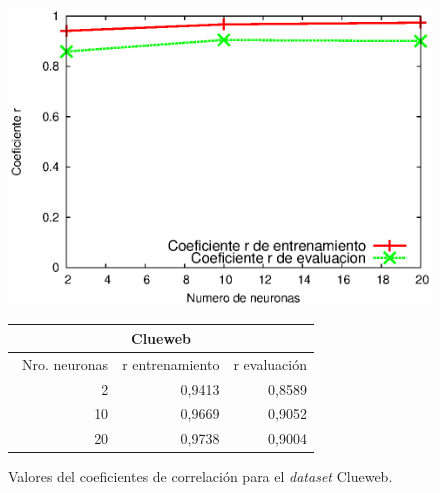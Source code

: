 \begin{figure}[tp]
  \begin{minipage}[][][b]{0.5\linewidth}
    \centering
    \includegraphics[width=\linewidth]{images/cluewebRN.eps}
  \end{minipage}%
  \begin{minipage}[b]{0.30\linewidth}
    		\centering
		\begin{tabular}{|r|r|r|}
		\hline
		\multicolumn{ 3}{|c|}{Clueweb} \\ \hline
		\multicolumn{1}{|l|}{\ Nro. neuronas} & \multicolumn{1}{l|}{r entrenamiento} & \multicolumn{1}{l|}{r evaluación} \\ \hline
		2 & 0,9413 & 0,8589 \\ \hline
		10 & 0,9669 & 0,9052 \\ \hline
		20 & 0,9738 & 0,9004 \\ \hline
		\end{tabular}
   \end{minipage}
\caption{Valores del coeficientes de correlación para el \textit{dataset} Clueweb.}
\label{fig:cluewebRN}
\end{figure}

